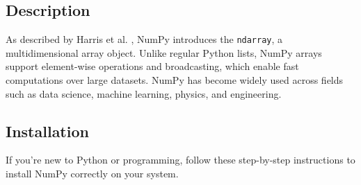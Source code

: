 \subsection{Description}
As described by Harris et al. \cite{harris2020array}, NumPy introduces the \texttt{ndarray}, a multidimensional array object. Unlike regular Python lists, NumPy arrays support element-wise operations and broadcasting, which enable fast computations over large datasets. NumPy has become widely used across fields such as data science, machine learning, physics, and engineering.


\subsection{Installation}

If you're new to Python or programming, follow these step-by-step instructions to install NumPy correctly on your system.

